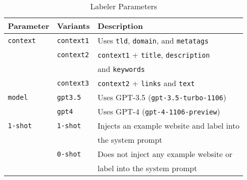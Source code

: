 \begin{table}[htbp]
    \centering
    \caption{
        Labeler Parameters
    }

    \begin{tabular}{lll}
        \toprule
        \textbf{Parameter} & \textbf{Variants} & \textbf{Description} \\
        \midrule
        \texttt{context} 
            & \texttt{context1} & Uses \texttt{tld}, \texttt{domain}, and \texttt{metatags} \\
            
            & \texttt{context2} & \texttt{context1} + \texttt{title}, \texttt{description} \\ & & and \texttt{keywords} \\
            
            & \texttt{context3} & \texttt{context2} + \texttt{links} and \texttt{text} \\

        \addlinespace
        \texttt{model} 
            & \texttt{gpt3.5} & Uses GPT-3.5 (\texttt{gpt-3.5-turbo-1106}) \\
            
            & \texttt{gpt4}   & Uses GPT-4 (\texttt{gpt-4-1106-preview}) \\
        
        \addlinespace
        \texttt{1-shot} 
            & \texttt{1-shot} & Injects an example website and label into \\ & & the system prompt \\
            
            & \texttt{0-shot} & Does not inject any example website or \\ & & label into  the system prompt \\
        \bottomrule
    
    \end{tabular}
    \label{tab:labeler-params}
\end{table}
